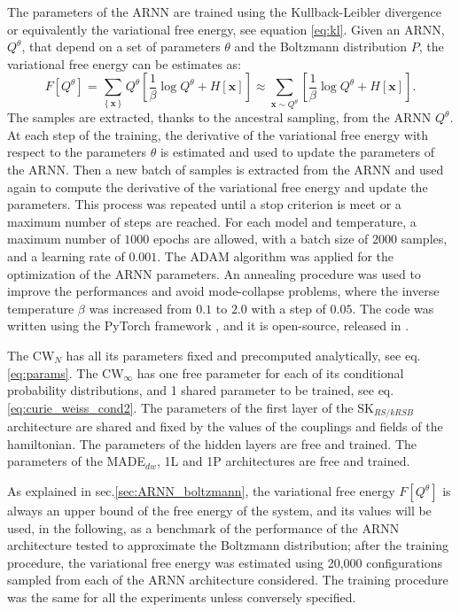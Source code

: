 \documentclass[aps,physrev,10pt,floatfix,reprint]{revtex4-2}
\begin{document}
The parameters of the ARNN are trained using the Kullback-Leibler divergence or equivalently the variational free energy, see equation \ref{eq:kl}. Given an ARNN, $Q^{\theta}$, that depend on a set of parameters $\theta$ and the Boltzmann distribution $P$, the variational free energy can be estimates as:
$$
F[Q^{\theta}]= \sum_{\left\{ \mathbf{x} \right\}}Q^{\theta}\left[\frac{1}{\beta}\log Q^{\theta} + H[\mathbf{x}] \right] \approx \sum_{\mathbf{x} \sim Q^{\theta}} \left[ \frac{1}{\beta}\log Q^{\theta} + H[\mathbf{x}]\right].
$$
The samples are extracted, thanks to the ancestral sampling, from the ARNN $Q^{\theta}$. At each step of the training, the derivative of the variational free energy with respect to the parameters $\theta$ is estimated and used to update the parameters of the ARNN. Then a new batch of samples is extracted from the ARNN and used again to compute the derivative of the variational free energy and update the parameters\cite{Wu2019}. This process was repeated until a stop criterion is meet or a maximum number of steps are reached. For each model and temperature, a maximum number of $1000$ epochs are allowed, with a batch size of $2000$ samples, and a learning rate of $0.001$. The ADAM algorithm was applied for the optimization of the ARNN parameters. An annealing procedure was used to improve the performances and avoid mode-collapse problems\cite{Wu2019}, where the inverse temperature $\beta$ was increased from $0.1$ to $2.0$ with a step of $0.05$. The code was written using the PyTorch framework \cite{NEURIPS2019_bdbca288}, and it is open-source, released in \cite{mygithub}.

The CW$_N$ has all its parameters fixed and precomputed analytically, see eq.\ref{eq:params}. The CW$_{\infty}$ has one free parameter for each of its conditional probability distributions, and 1 shared parameter to be trained, see eq.\ref{eq:curie_weiss_cond2}. The parameters of the first layer of the SK$_{RS/kRSB}$ architecture are shared and fixed by the values of the couplings and fields of the hamiltonian. The parameters of the hidden layers are free and trained. The parameters of the MADE$_{dw}$, 1L and 1P architectures are free and trained.


As explained in sec.\ref{sec:ARNN_boltzmann}, the variational free energy $F[Q^{\theta}]$ is always an upper bound of the free energy of the system, and its values will be used, in the following, as a benchmark of the performance of the ARNN architecture tested to approximate the Boltzmann distribution; after the training procedure, the variational free energy was estimated using 20,000 configurations sampled from each of the ARNN architecture considered. 
The training procedure was the same for all the experiments unless conversely specified.
\end{document}
